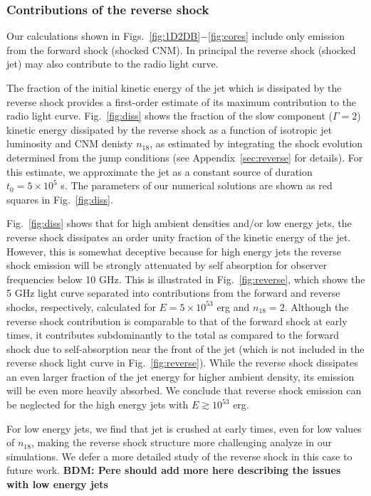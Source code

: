 \documentclass[usenatbib,fleqn]{mnras}
\begin{document}
\subsubsection{Contributions of the reverse shock}
Our calculations shown in Figs.~\ref{fig:1D2DB}$-$\ref{fig:cores}
include only emission from the forward shock (shocked CNM).  In
principal the reverse shock (shocked jet) may also contribute to the
radio light curve.

The fraction of the initial kinetic energy of the jet which is
dissipated by the reverse shock provides a first-order estimate of its
maximum contribution to the radio light curve.  Fig.~\ref{fig:diss}
shows the fraction of the slow component ($\Gamma=2$) kinetic energy
dissipated by the reverse shock as a function of isotropic jet
luminosity and CNM denisty $n_{18}$, as estimated by integrating the
shock evolution determined from the jump conditions (see
Appendix~\ref{sec:reverse} for details).  For this estimate, we
approximate the jet as a constant source of duration $t_0 = 5 \times
10^{5}$ s.  The parameters of our numerical solutions are shown as red
squares in Fig.~\ref{fig:diss}.


Fig.~\ref{fig:diss} shows that for high ambient densities and/or low
energy jets, the reverse shock dissipates an order unity fraction of
the kinetic energy of the jet.  However, this is somewhat deceptive
because for high energy jets the reverse shock emission will be
strongly attenuated by self absorption for observer frequencies below
10 GHz.  This is illustrated in Fig.~\ref{fig:reverse}, which shows
the 5 GHz light curve separated into contributions from the forward
and reverse shocks, respectively, calculated for $E = 5\times 10^{53}$
erg and $n_{18} = 2$.  Although the reverse shock contribution is
comparable to that of the forward shock at early times, it contributes
subdominantly to the total as compared to the forward shock due to
self-absorption near the front of the jet (which is not included in
the reverse shock light curve in Fig.~\ref{fig:reverse}).  While the
reverse shock dissipates an even larger fraction of the jet energy for
higher ambient density, its emission will be even more heavily
absorbed.  We conclude that reverse shock emission can be neglected
for the high energy jets with $E\gtrsim 10^{53}$ erg.

For low energy jets, we find that jet is crushed at early times, even
for low values of $n_{18}$, making the reverse shock structure more
challenging analyze in our simulations.  We defer a more detailed
study of the reverse shock in this case to future work.  {\bf BDM:
  Pere should add more here describing the issues with low energy
  jets}
\end{document}
